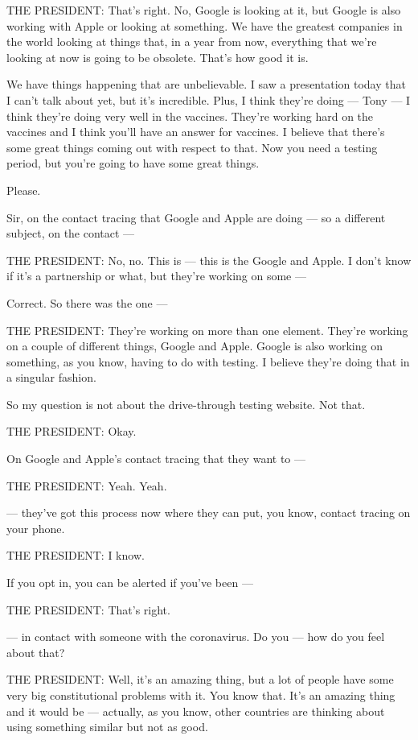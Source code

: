 THE PRESIDENT: That's right. No, Google is looking at it, but Google is
also working with Apple or looking at something. We have the greatest
companies in the world looking at things that, in a year from now,
everything that we're looking at now is going to be obsolete. That's how
good it is.

We have things happening that are unbelievable. I saw a presentation
today that I can't talk about yet, but it's incredible. Plus, I think
they're doing --- Tony --- I think they're doing very well in the
vaccines. They're working hard on the vaccines and I think you'll have
an answer for vaccines. I believe that there's some great things coming
out with respect to that. Now you need a testing period, but you're
going to have some great things.

Please.

Sir, on the contact tracing that Google and Apple are doing --- so a
different subject, on the contact ---

THE PRESIDENT: No, no. This is --- this is the Google and Apple. I don't
know if it's a partnership or what, but they're working on some ---

Correct. So there was the one ---

THE PRESIDENT: They're working on more than one element. They're working
on a couple of different things, Google and Apple. Google is also
working on something, as you know, having to do with testing. I believe
they're doing that in a singular fashion.

So my question is not about the drive-through testing website. Not that.

THE PRESIDENT: Okay.

On Google and Apple's contact tracing that they want to ---

THE PRESIDENT: Yeah. Yeah.

--- they've got this process now where they can put, you know, contact
tracing on your phone.

THE PRESIDENT: I know.

If you opt in, you can be alerted if you've been ---

THE PRESIDENT: That's right.

--- in contact with someone with the coronavirus. Do you --- how do you
feel about that?

THE PRESIDENT: Well, it's an amazing thing, but a lot of people have
some very big constitutional problems with it. You know that. It's an
amazing thing and it would be --- actually, as you know, other countries
are thinking about using something similar but not as good.

